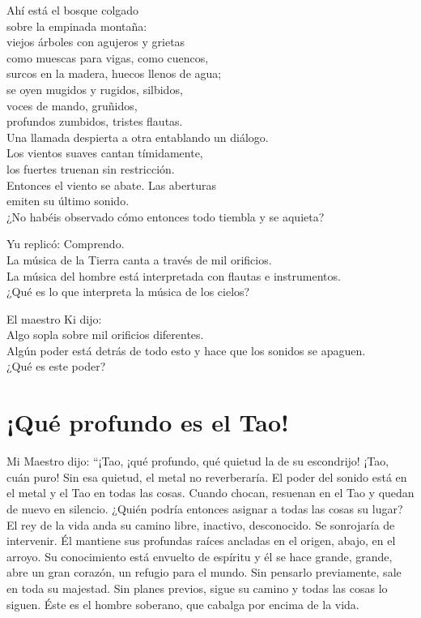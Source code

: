 \documentclass[book,b5paper,hidelinks,final]{memoir}
\begin{document}
	Ahí está el bosque colgado\\
	sobre la empinada montaña:\\
	viejos árboles con agujeros y grietas\\
	como muescas para vigas, como cuencos,\\
	surcos en la madera, huecos llenos de agua;\\
	se oyen mugidos y rugidos, silbidos,\\
	voces de mando, gruñidos,\\
	profundos zumbidos, tristes flautas.\\
	Una llamada despierta a otra entablando un diálogo.\\
	Los vientos suaves cantan tímidamente,\\
	los fuertes truenan sin restricción.\\
	Entonces el viento se abate. Las aberturas\\
	emiten su último sonido.\\
	¿No habéis observado cómo entonces todo tiembla y se aquieta?
	
	Yu replicó: Comprendo.\\
	La música de la Tierra canta a través de mil orificios.\\
	La música del hombre está interpretada con flautas e instrumentos.\\
	¿Qué es lo que interpreta la música de los cielos?
	
	El maestro Ki dijo:\\
	Algo sopla sobre mil orificios diferentes.\\
	Algún poder está detrás de todo esto y hace que los sonidos se
	apaguen.\\
	¿Qué es este poder?
	
	\chapter*{¡Qué profundo es el Tao!}
	
	Mi Maestro dijo: ``¡Tao, ¡qué profundo, qué quietud la de su escondrijo!
	¡Tao, cuán puro! Sin esa quietud, el metal no reverberaría. El poder del
	sonido está en el metal y el Tao en todas las cosas. Cuando chocan,
	resuenan en el Tao y quedan de nuevo en silencio. ¿Quién podría entonces
	asignar a todas las cosas su lugar? El rey de la vida anda su camino
	libre, inactivo, desconocido. Se sonrojaría de intervenir. Él mantiene
	sus profundas raíces ancladas en el origen, abajo, en el arroyo. Su
	conocimiento está envuelto de espíritu y él se hace grande, grande, abre
	un gran corazón, un refugio para el mundo. Sin pensarlo previamente,
	sale en toda su majestad. Sin planes previos, sigue su camino y todas
	las cosas lo siguen. Éste es el hombre soberano, que cabalga por encima
	de la vida.
	
\end{document}
